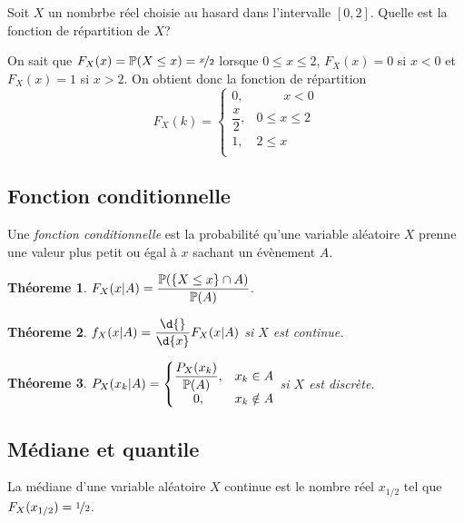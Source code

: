 \documentclass[11pt]{article}
\renewcommand\P{%
	\ensuremath{%
		\mathbb{P}%
	}%
}%
\newtheorem{theoreme}{Théoreme}[section]
\begin{document}
\begin{exemple}
	Soit $X$ un nombrbe réel choisie au hasard dans l'intervalle $[0,2]$.
	Quelle est la fonction de répartition de $X$?

	On sait que $F_X(x)=\P(X\leq x)=\nicefrac{x}{2}$ lorsque $0\leq x\leq 2$,
	$F_X(x)=0$ si $x<0$ et $F_X(x)=1$ si $x>2$. On obtient donc la fonction de
	répartition
	\begin{equation*}
		F_X(k)=\left\{
			\begin{matrix}
				0,            & \phantom{0\;\leq}x<0\\
				\dfrac{x}{2}, & 0\leq x\leq 2\\
				1,            & 2\leq x\phantom{\leq 0\;}\\
			\end{matrix}
		\right.
	\end{equation*}
\end{exemple}

\subsection{Fonction conditionnelle}
\begin{definition}
	Une \textit{fonction conditionnelle} est la probabilité qu'une variable
	aléatoire $X$ prenne une valeur plus petit ou égal à  $x$ sachant un
	évènement $A$.
\end{definition}

\begin{theoreme}
	$F_X(x|A)=\dfrac{\P(\left\{X\leq x\right\}\cap A)}{\P(A)}$.
\end{theoreme}

\begin{theoreme}
	$f_X(x|A)=\dfrac{\d{}}{\d{x}}F_X(x|A)$ si $X$ est continue.
\end{theoreme}

\begin{theoreme}
	$P_X(x_k|A)=
	\left\{
		\begin{matrix}
			\dfrac{P_X(x_k)}{\P(A)}, & x_k\in A\\
			0, & x_k\notin A\\
		\end{matrix}
	\right.$
	si $X$ est discrète.
\end{theoreme}

\subsection{Médiane et quantile}
\begin{definition}
	La médiane d'une variable aléatoire $X$ continue est le nombre réel
	$x_{1/2}$ tel que $F_X(x_{1/2})=\nicefrac{1}{2}$.
\end{definition}
\end{document}
